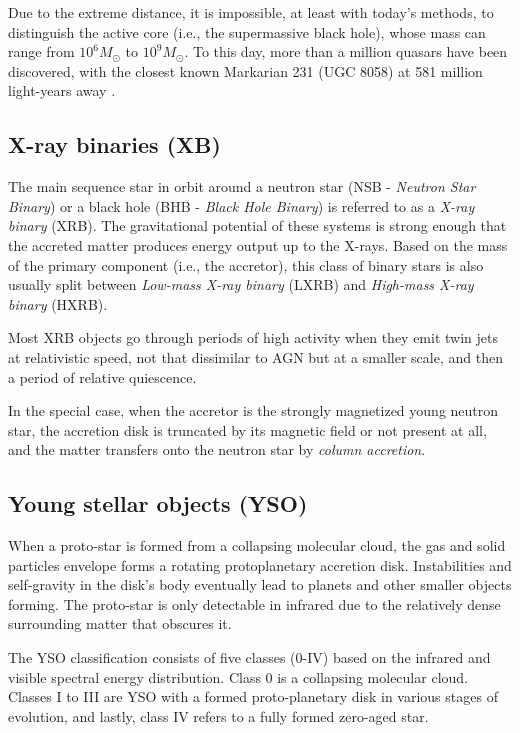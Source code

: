     Due to the extreme distance, it is impossible, at least with today's methods, to distinguish the active core (i.e., the supermassive black hole), whose mass can range from $10^6 M_{\odot}$ to $10^{9} M_{\odot}$. To this day, more than a million quasars have been discovered, with the closest known Markarian 231 (UGC 8058) at 581 million light-years away \cite{gaia2018}. 


\subsection{X-ray binaries (XB)}
    The main sequence star in orbit around a neutron star (NSB - \emph{Neutron Star Binary}) or a black hole (BHB - \emph{Black Hole Binary}) is referred to as a \emph{X-ray binary} (XRB). The gravitational potential of these systems is strong enough that the accreted matter produces energy output up to the X-rays. Based on the mass of the primary component (i.e., the accretor), this class of binary stars is also usually split between \emph{Low-mass X-ray binary} (LXRB) and \emph{High-mass X-ray binary} (HXRB). 

    Most XRB objects go through periods of high activity when they emit twin jets at relativistic speed, not that dissimilar to AGN but at a smaller scale, and then a period of relative quiescence.

    In the special case, when the accretor is the strongly magnetized young neutron star, the accretion disk is truncated by its magnetic field or not present at all, and the matter transfers onto the neutron star by \emph{column accretion}.
    

\subsection{Young stellar objects (YSO)}
    When a proto-star is formed from a collapsing molecular cloud, the gas and solid particles envelope forms a rotating protoplanetary accretion disk. Instabilities and self-gravity in the disk's body eventually lead to planets and other smaller objects forming. The proto-star is only detectable in infrared due to the relatively dense surrounding matter that obscures it. 

    The YSO classification consists of five classes (0-IV) based on the infrared and visible spectral energy distribution. Class 0 is a collapsing molecular cloud. Classes I to III are YSO with a formed proto-planetary disk in various stages of evolution, and lastly, class IV refers to a fully formed zero-aged star. 

